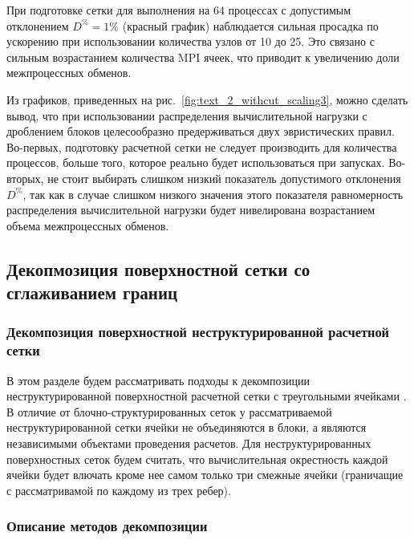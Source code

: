 При подготовке сетки для выполнения на 64 процессах с допустимым отклонением $D^{\%} = 1\%$ (красный график) наблюдается сильная просадка по ускорению при использовании количества узлов от 10 до 25.
Это связано с сильным возрастанием количества MPI ячеек\label{term:cell_block_mpi2}, что приводит к увеличению доли межпроцессных обменов.

Из графиков, приведенных на рис.~\ref{fig:text_2_withcut_scaling3}, можно сделать вывод, что при использовании распределения вычислительной нагрузки с дроблением блоков целесообразно предерживаться двух эвристических правил.
Во-первых, подготовку расчетной сетки не следует производить для количества процессов, больше того, которое реально будет использоваться при запусках.
Во-вторых, не стоит выбирать слишком низкий показатель допустимого отклонения $D^{\%}$, так как в случае слишком низкого значения этого показателя равномерность распределения вычислительной нагрузки будет нивелирована возрастанием объема межпроцессных обменов.


\subsection{Декопмозиция поверхностной сетки со сглаживанием границ}

\subsubsection{Декомпозиция поверхностной неструктурированной расчетной сетки}

В этом разделе будем рассматривать подходы к декомпозиции неструктурированной поверхностной расчетной сетки с треугольными ячейками\label{term:unstruct_surf_calc_mesh3} \cite{Rybakov2020Decomp}.
В отличие от блочно-структурированных сеток\label{term:mesh_block_struct4} у рассматриваемой неструктурированной сетки ячейки не объединяются в блоки, а являются независимыми объектами проведения расчетов.
Для неструктурированных поверхностных сеток будем считать, что вычислительная окрестность\label{term:cell_calc_template2} каждой ячейки будет влючать кроме нее самом только три смежные ячейки (граничащие с рассматривамой по каждому из трех ребер).

\subsubsection{Описание методов декомпозиции}

